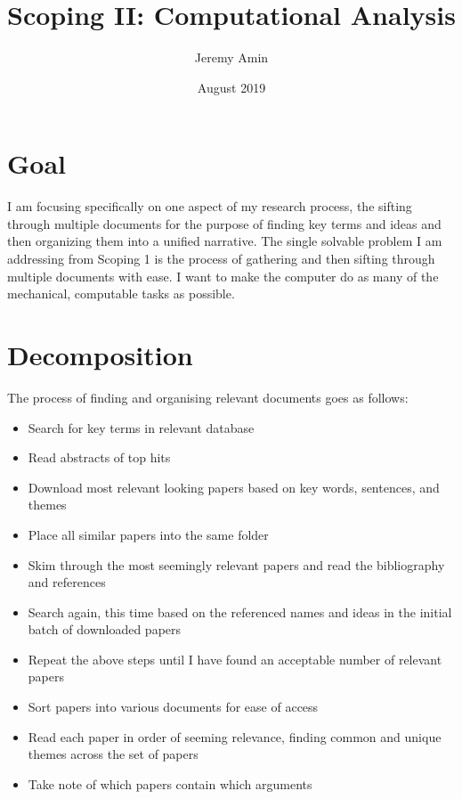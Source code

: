 \documentclass{article}
\title{Scoping II: Computational Analysis}
\author{Jeremy Amin}
\date{August 2019}
\begin{document}
\maketitle

\section{Goal}

I am focusing specifically on one aspect of my research process, the sifting through multiple documents for the purpose of finding key terms and ideas and then organizing them into a unified narrative. The single solvable problem I am addressing from Scoping 1 is the process of gathering and then sifting through multiple documents with ease. I want to make the computer do as many of the mechanical, computable tasks as possible.

\section{Decomposition}

The process of finding and organising relevant documents goes as follows:

\begin{itemize}

    \item Search for key terms in relevant database
    \item Read abstracts of top hits
    \item Download most relevant looking papers based on key words, sentences, and themes
    \item Place all similar papers into the same folder
    \item Skim through the most seemingly relevant papers and read the bibliography and references
    \item Search again, this time based on the referenced names and ideas in the initial batch of downloaded papers
    \item Repeat the above steps until I have found an acceptable number of relevant papers
    \item Sort papers into various documents for ease of access
    \item Read each paper in order of seeming relevance, finding common and unique themes across the set of papers
    \item Take note of which papers contain which arguments
\end{itemize}
\end{document}
